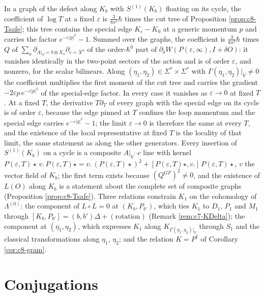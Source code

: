 \begin{remark}
In a graph of the defect along $K_b$ with $S^{(1)}(K_b)$ floating on its cycle, the coefficient of $\log T$ at a fixed $\varepsilon$ is $\tfrac{3}{8\pi^2}\hbar$ times the cut tree of Proposition \ref{prop:c8-Tsafe}; this tree contains the special edge $K_\varepsilon-K_0$ at a generic momentum $p$ and carries the factor $e^{-\varepsilon|p|^2}-1$. Summed over the graphs, the coefficient is $\tfrac{3}{8\pi^2}\hbar$ times $Q$ of $\sum_a\partial_{A|_V=b\otimes X_a}\partial_{c=X^a}$ of the order-$\hbar^0$ part of $\partial_\delta W(P(\varepsilon,\infty),I+\delta O)$: it vanishes identically in the two-point sectors of the action and is of order $\varepsilon$, and nonzero, for the scalar bilinears. Along $(\eta_1,\eta_2)\in\Sigma^*\times\Sigma^*$ with $\Gamma(\eta_1,\eta_2)|_V\neq0$ the coefficient multiplies the first moment of the cut tree and carries the gradient $-2\varepsilon p\,e^{-\varepsilon|p|^2}$ of the special-edge factor. In every case it vanishes as $\varepsilon\to0$ at fixed $T$. At a fixed $T$, the derivative $T\partial_T$ of every graph with the special edge on its cycle is of order $\varepsilon$, because the edge pinned at $T$ confines the loop momentum and the special edge carries $e^{-\varepsilon|q|^2}-1$; the limit $\varepsilon\to0$ is therefore the same at every $T$, and the existence of the local representative at fixed $T$ is the locality of that limit, the same statement as along the other generators. Every insertion of $S^{(1)}(K_b)$ on a cycle is a composite $A|_V$--$c$ line with kernel $P(\varepsilon,T)\star\,v.\,P(\varepsilon,T)\star=v.\,(P(\varepsilon,T)\star)^2+[P(\varepsilon,T)\star,v.]\,P(\varepsilon,T)\star$, $v$ the vector field of $K_b$; the first term exists because $(Q^{GF})^2\neq0$, and the existence of $L(O)$ along $K_b$ is a statement about the complete set of composite graphs (Proposition \ref{prop:c8-Tsafe}). Three relations constrain $K_1$ on the cohomology of $\Lambda^{(0)}$: the component of $L\circ L=0$ at $(K_b,P_{b'})$, which ties $K_1$ to $D_1$, $P_1$ and $M_1$ through $[K_b,P_{b'}]=(b,b')\Delta+(\text{rotation})$ (Remark \ref{rem:c7-KDelta}); the component at $(\eta_1,\eta_2)$, which expresses $K_1$ along $K_{\Gamma(\eta_1,\eta_2)|_V}$ through $S_1$ and the classical transformations along $\eta_1$, $\eta_2$; and the relation $K=P^\dagger$ of Corollary \ref{cor:c8-gram}.
\end{remark}

\section{Conjugations}

